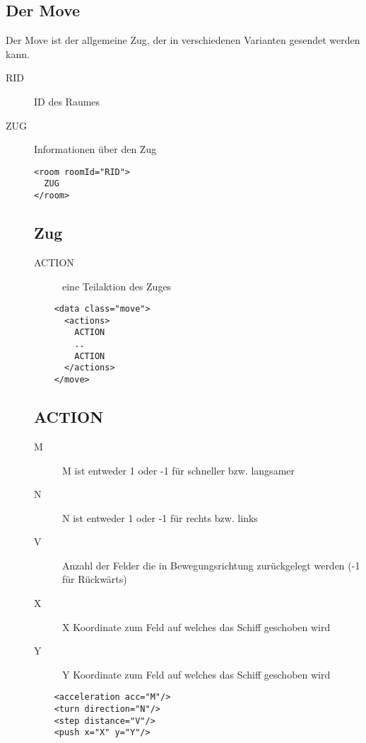 \documentclass[12pt,a4paper, ngerman, oneside]{scrartcl}
\begin{document}
\subsection{\label{Move}Der Move}
Der Move ist der allgemeine Zug, der in verschiedenen Varianten gesendet werden kann.
\begin{description}
\item[RID] ID des Raumes
\item[ZUG] Informationen über den Zug
\begin{verbatim}
<room roomId="RID">
  ZUG
</room>

\end{verbatim}
\subsection{Zug}
\label{move}
\begin{description}
\item[ACTION] eine Teilaktion des Zuges
\end{description}
\begin{verbatim}
	<data class="move">
	  <actions>
	    ACTION
	    ..
	    ACTION
	  </actions>
	</move>
\end{verbatim}

\subsection{ACTION}
\label{action}
\begin{description}
\item[M] M ist entweder 1 oder -1 für schneller bzw. langsamer
\item[N] N ist entweder 1 oder -1 für rechts bzw. links
\item[V] Anzahl der Felder die in Bewegungsrichtung zurückgelegt werden (-1 für Rückwärts)
\item[X] X Koordinate zum Feld auf welches das Schiff geschoben wird
\item[Y] Y Koordinate zum Feld auf welches das Schiff geschoben wird
\end{description}
\begin{verbatim}
	<acceleration acc="M"/>
	<turn direction="N"/>
	<step distance="V"/>  
	<push x="X" y="Y"/>
\end{verbatim}
\end{description}
\end{document}
